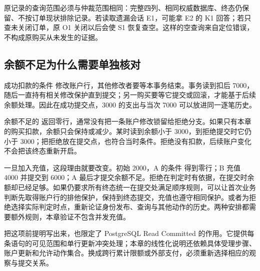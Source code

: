 原记录的查询范围必须与仲裁范围相同：完整四列、相同权威数据库、终态仍保留、不按订单现状排除记录。若读取遗漏会话 E1，可能拿 E2 的 K1 回答；若只查未关闭订单，原 O1 关闭以后会使 S1 恢复查空。这样的空查询来自定位错误，不构成原购买从未发生的证据。

\subsection*{余额不足为什么需要单独核对}

成功扣款的条件  修改账户行，其他修改者要等本事务结束。事务读到扣后 7000，随后一直持有相关修改保护直到提交；另一购买要等它提交或回滚，才能基于后续余额处理。因此在成功提交点，3000 的支出与当次 7000 可以放进同一逐笔历史。

余额不足的  返回零行，通常没有把一条账户修改锁留给拒绝分支。如果只有本章的购买扣款，余额只会保持或减少。某时读到余额小于 3000，到拒绝提交时它仍小于 3000；把拒绝放在提交点，也符合当时条件。拒绝没有扣款，后续账户变化不会把该终态重新开启。



一旦加入充值，这段理由就要改变。初始 2000，A 的条件  得到零行；B 充值 4000 并提交到 6000；A 最后才提交余额不足。拒绝在判定时有依据，在提交时余额却已经足够。如果仍要求所有终态统一在提交处满足顺序规则，可以让首次业务判断先取得账户行的排他保护，保持到终态提交，充值也遵守相同保护。或者为拒绝选择实际判定时点，重新论证身份发布、查询与其他动作的历史。两种安排都需要额外规则，本章验证不包含并发充值。



把这项前提明写出来，也限定了 PostgreSQL Read Committed 的作用。它提供每条语句的可见范围和单行更新冲突处理；本章的线性化说明还依赖具体受理步骤、账户更新和允许动作集合。换成跨行累计限额或外部支付，必须重新选择相应的观察与提交关系。
\FloatBarrier

